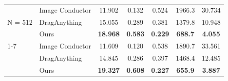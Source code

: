 \begin{table}[ht]
\begin{center}
{\begin{tabular}{llccccc}
    \multirow{ 3}{*}{N = 512} & Image Conductor & 11.902 & 0.132 & 0.524 & 1966.3 & 30.734  \\
    & DragAnything & 15.055 & 0.289 & 0.381 & 1379.8 & 10.948  \\
    & Ours & \textbf{18.968} & \textbf{0.583} & \textbf{0.229} & \textbf{688.7} & \textbf{4.055}  \\
    \cmidrule(lr){1-7}
    
    \multirow{ 3}{*}{N = 2048} & Image Conductor & 11.609 & 0.120 & 0.538 & 1890.7 & 33.561 \\
    & DragAnything & 14.845 & 0.286 & 0.397 & 1468.4 & 12.485  \\
    & Ours & \textbf{19.327} & \textbf{0.608} & \textbf{0.227} & \textbf{655.9} & \textbf{3.887}  \\
    
    \bottomrule
    \end{tabular}
   }
    \end{center}
\aftertab    
\end{table}





    
     

    
    
    
    
    
    
